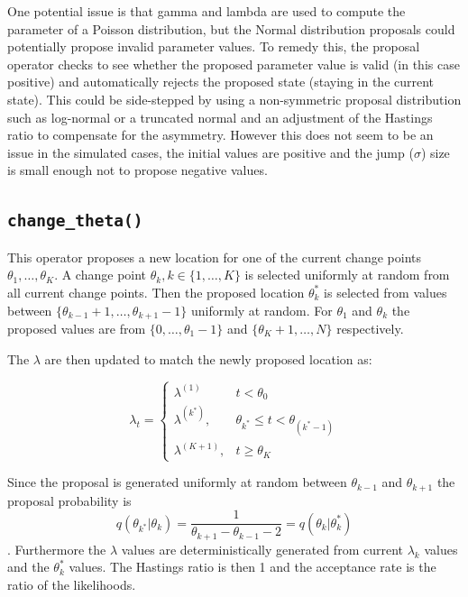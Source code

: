 \documentclass[11pt,a4paper]{article}
\begin{document}
One potential issue is that gamma and lambda are used to compute the
parameter of a Poisson distribution, but the Normal distribution
proposals could potentially propose invalid parameter values. To remedy
this, the proposal operator checks to see whether the proposed parameter
value is valid (in this case positive) and automatically rejects the
proposed state (staying in the current state). This could be
side-stepped by using a non-symmetric proposal distribution such as
log-normal or a truncated normal and an adjustment of the Hastings ratio
to compensate for the asymmetry. However this does not seem to be an
issue in the simulated cases, the initial values are positive and the
jump (\(\sigma\)) size is small enough not to propose negative values.

\hypertarget{change_theta}{%
\subsection{\texorpdfstring{\texttt{change\_theta()}}{change\_theta()}}\label{change_theta}}

This operator proposes a new location for one of the current change
points \(\theta_1,\dots, \theta_K\). A change point
\(\theta_k, k \in \{1, \dots, K\}\) is selected uniformly at random from
all current change points. Then the proposed location \(\theta_k^*\) is
selected from values between
\(\{\theta_{k-1}+1,\dots, \theta_{k+1}-1\}\) uniformly at random. For
\(\theta_1\) and \(\theta_k\) the proposed values are from
\(\{0,\dots, \theta_1-1\}\) and \(\{\theta_K+1,\dots, N\}\)
respectively.

The \(\lambda\) are then updated to match the newly proposed location
as:

\[ \lambda_t =  \begin{cases} \lambda^{(1)} & t < \theta_0 \\
\lambda^{(k^*)}, & \theta_{k^*} \leq t < \theta_{(k^*-1)} \\
\lambda^{(K+1)}, & t \geq \theta_K \end{cases}\]

Since the proposal is generated uniformly at random between
\(\theta_{k-1}\) and \(\theta_{k+1}\) the proposal probability is
\[q(\theta_{k^*}|\theta_k) = \frac{1}{\theta_{k+1}-\theta_{k-1}-2} = q(\theta_k|\theta_k^*)\].
Furthermore the \(\lambda\) values are deterministically generated from
current \(\lambda_k\) values and the \(\theta_k^*\) values. The Hastings
ratio is then 1 and the acceptance rate is the ratio of the likelihoods.
\end{document}
